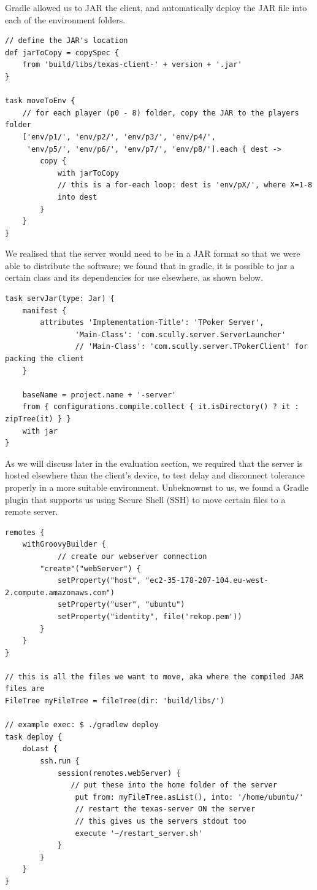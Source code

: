 \documentclass[11pt]{article}
\begin{document}

Gradle allowed us to JAR the client, and automatically deploy the JAR file into each of the environment folders. 

\begin{lstlisting}
// define the JAR's location
def jarToCopy = copySpec {
    from 'build/libs/texas-client-' + version + '.jar'
}

task moveToEnv {
	// for each player (p0 - 8) folder, copy the JAR to the players folder
    ['env/p1/', 'env/p2/', 'env/p3/', 'env/p4/', 
     'env/p5/', 'env/p6/', 'env/p7/', 'env/p8/'].each { dest ->
        copy {
            with jarToCopy
            // this is a for-each loop: dest is 'env/pX/', where X=1-8
            into dest
        }
    }
}
\end{lstlisting}

We realised that the server would need to be in a JAR format so that we were able to distribute the software; we found that in gradle, it is possible to jar a certain class and its dependencies for use elsewhere, as shown below.

\begin{lstlisting}
task servJar(type: Jar) {
    manifest {
        attributes 'Implementation-Title': 'TPoker Server',
                'Main-Class': 'com.scully.server.ServerLauncher'
                // 'Main-Class': 'com.scully.server.TPokerClient' for packing the client
    }

    baseName = project.name + '-server'
    from { configurations.compile.collect { it.isDirectory() ? it : zipTree(it) } }
    with jar
}
\end{lstlisting}


As we will discuss later in the evaluation section, we required that the server is hosted elsewhere than the client's device, to test delay and disconnect tolerance properly in a more suitable environment. Unbeknownst to us, we found a Gradle plugin that supports us using Secure Shell (SSH) to move certain files to a remote server. \\

\begin{lstlisting} 
remotes {
    withGroovyBuilder {
    		// create our webserver connection
        "create"("webServer") {
            setProperty("host", "ec2-35-178-207-104.eu-west-2.compute.amazonaws.com")
            setProperty("user", "ubuntu")
            setProperty("identity", file('rekop.pem'))
        }
    }
}

// this is all the files we want to move, aka where the compiled JAR files are
FileTree myFileTree = fileTree(dir: 'build/libs/')

// example exec: $ ./gradlew deploy
task deploy {
    doLast {
        ssh.run {
            session(remotes.webServer) {
           	   // put these into the home folder of the server
                put from: myFileTree.asList(), into: '/home/ubuntu/'
                // restart the texas-server ON the server 
                // this gives us the servers stdout too
                execute '~/restart_server.sh'
            }
        }
    }
}
\end{lstlisting}
\end{document}

